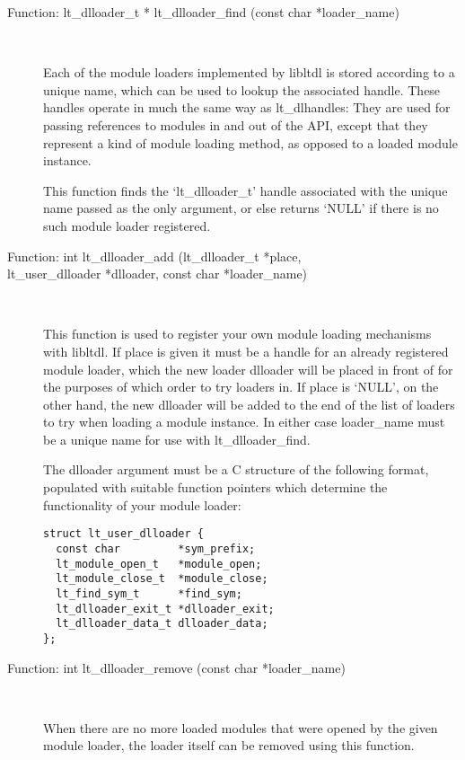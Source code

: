 \begin{description}
\item[Function: lt\_{}dlloader\_{}t * lt\_{}dlloader\_{}find (const char *loader\_{}name)]
\

    Each of the module loaders implemented by libltdl is stored according to a unique name, which can be used to lookup the associated handle. These handles operate in much the same way as lt\_{}dlhandles: They are used for passing references to modules in and out of the API, except that they represent a kind of module loading method, as opposed to a loaded module instance.

    This function finds the `lt\_{}dlloader\_{}t' handle associated with the unique name passed as the only argument, or else returns `NULL' if there is no such module loader registered. 

\item[Function: int lt\_{}dlloader\_{}add (lt\_{}dlloader\_{}t *place,]
\item[lt\_{}user\_{}dlloader *dlloader, const char *loader\_{}name)]
\

    This function is used to register your own module loading mechanisms with libltdl. If place is given it must be a handle for an already registered module loader, which the new loader dlloader will be placed in front of for the purposes of which order to try loaders in. If place is `NULL', on the other hand, the new dlloader will be added to the end of the list of loaders to try when loading a module instance. In either case loader\_{}name must be a unique name for use with lt\_{}dlloader\_{}find.

    The dlloader argument must be a C structure of the following format, populated with suitable function pointers which determine the functionality of your module loader: 

\begin{Verbatim}[frame=single]
struct lt_user_dlloader {
  const char         *sym_prefix;
  lt_module_open_t   *module_open;
  lt_module_close_t  *module_close;
  lt_find_sym_t      *find_sym;
  lt_dlloader_exit_t *dlloader_exit;
  lt_dlloader_data_t dlloader_data;
};
\end{Verbatim}

\item[Function: int lt\_{}dlloader\_{}remove (const char *loader\_{}name)]
\

    When there are no more loaded modules that were opened by the given module loader, the loader itself can be removed using this function.
\end{description}

